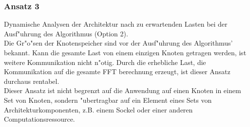 \subsubsection{Ansatz 3}
Dynamische Analysen der Architektur nach zu erwartenden Lasten bei der Ausf"uhrung des Algorithmus (Option 2).\\ Die Gr"o"sen der Knotenspeicher sind vor der Ausf"uhrung des Algorithmus' bekannt. Kann die gesamte Last von einem einzigen Knoten getragen werden, ist weitere Kommunikation nicht n"otig. Durch die erhebliche Last, die Kommunikation auf die gesamte FFT berechnung erzeugt, ist dieser Ansatz durchaus rentabel.\\

Dieser Ansatz ist nicht begrenzt auf die Anwendung auf einen Knoten in einem Set von Knoten, sondern "ubertragbar auf ein Element eines Sets von Architekturkomponenten, z.B. einem Sockel oder einer anderen Computationsressource.

